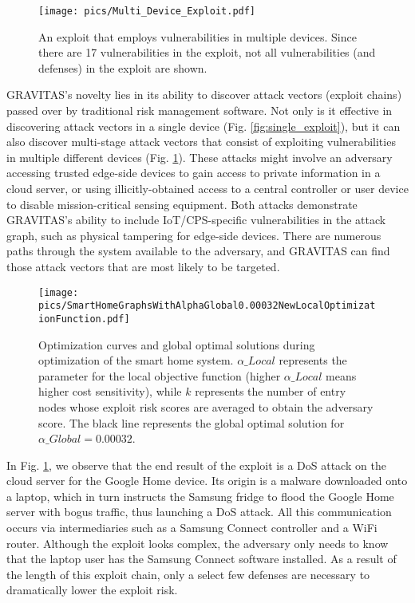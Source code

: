 \documentclass[10pt,journal,compsoc]{IEEEtran}
\begin{document}
\begin{figure}[h]
\centering
\texttt{[image: pics/Multi\_Device\_Exploit.pdf]}
\caption{An exploit that employs vulnerabilities in multiple devices. Since there are 17 vulnerabilities in the exploit, not all vulnerabilities (and defenses) in the exploit are shown.} 
\label{fig:multiple_exploit}
\end{figure}

\par GRAVITAS's novelty lies in its ability to discover attack vectors (exploit chains) passed over by traditional risk management software. Not only is it effective in discovering attack vectors in a single device (Fig. \ref{fig:single_exploit}), but it can also discover multi-stage attack vectors that consist of exploiting vulnerabilities in multiple different devices (Fig. \ref{fig:multiple_exploit}). These attacks might involve an adversary accessing trusted edge-side devices to gain access to private information in a cloud server, or using illicitly-obtained access to a central controller or user device to disable mission-critical sensing equipment. Both attacks demonstrate GRAVITAS's ability to include IoT/CPS-specific vulnerabilities in the attack graph, such as physical tampering for edge-side devices. There are numerous paths through the system available to the adversary, and GRAVITAS can find those attack vectors that are most likely to be targeted.

\begin{figure*}[t!]
\centering
\texttt{[image: pics/SmartHomeGraphsWithAlphaGlobal0.00032NewLocalOptimizationFunction.pdf]}

\caption{Optimization curves and global optimal solutions during optimization of the 
smart home system. $\alpha\_Local$ represents the parameter for the local objective function 
(higher $\alpha\_Local$ means higher cost sensitivity), while $k$ represents the number of entry 
nodes whose exploit risk scores are averaged to obtain the adversary score. The black 
line represents the global optimal solution for $\alpha\_Global = 0.00032$.} 
\label{fig:example_graphs}
\end{figure*}

\par In Fig. \ref{fig:multiple_exploit}, we observe that the end result of the exploit is a DoS attack on the cloud server for the Google Home device. Its origin is a malware downloaded onto a laptop, which in turn instructs the Samsung fridge to flood the Google Home server with bogus traffic, thus launching a DoS attack. All this communication occurs via intermediaries such as a Samsung Connect controller and a WiFi router. Although the exploit looks complex, the adversary only needs to know that the laptop user has the Samsung Connect software installed. As a result of the length of this exploit chain, only a select few defenses are necessary to dramatically lower the exploit risk. 
\end{document}

